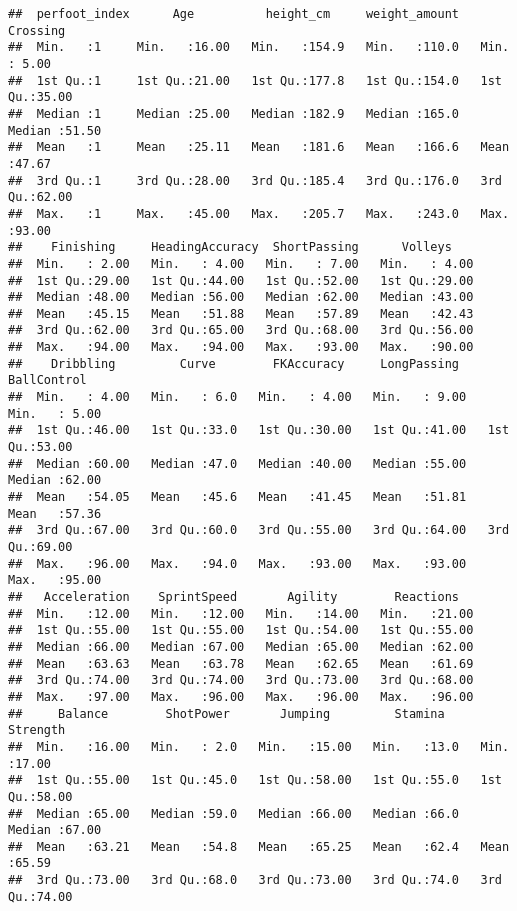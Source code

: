 \documentclass[
]{article}
\begin{document}
\begin{verbatim}
##  perfoot_index      Age          height_cm     weight_amount      Crossing    
##  Min.   :1     Min.   :16.00   Min.   :154.9   Min.   :110.0   Min.   : 5.00  
##  1st Qu.:1     1st Qu.:21.00   1st Qu.:177.8   1st Qu.:154.0   1st Qu.:35.00  
##  Median :1     Median :25.00   Median :182.9   Median :165.0   Median :51.50  
##  Mean   :1     Mean   :25.11   Mean   :181.6   Mean   :166.6   Mean   :47.67  
##  3rd Qu.:1     3rd Qu.:28.00   3rd Qu.:185.4   3rd Qu.:176.0   3rd Qu.:62.00  
##  Max.   :1     Max.   :45.00   Max.   :205.7   Max.   :243.0   Max.   :93.00  
##    Finishing     HeadingAccuracy  ShortPassing      Volleys     
##  Min.   : 2.00   Min.   : 4.00   Min.   : 7.00   Min.   : 4.00  
##  1st Qu.:29.00   1st Qu.:44.00   1st Qu.:52.00   1st Qu.:29.00  
##  Median :48.00   Median :56.00   Median :62.00   Median :43.00  
##  Mean   :45.15   Mean   :51.88   Mean   :57.89   Mean   :42.43  
##  3rd Qu.:62.00   3rd Qu.:65.00   3rd Qu.:68.00   3rd Qu.:56.00  
##  Max.   :94.00   Max.   :94.00   Max.   :93.00   Max.   :90.00  
##    Dribbling         Curve        FKAccuracy     LongPassing     BallControl   
##  Min.   : 4.00   Min.   : 6.0   Min.   : 4.00   Min.   : 9.00   Min.   : 5.00  
##  1st Qu.:46.00   1st Qu.:33.0   1st Qu.:30.00   1st Qu.:41.00   1st Qu.:53.00  
##  Median :60.00   Median :47.0   Median :40.00   Median :55.00   Median :62.00  
##  Mean   :54.05   Mean   :45.6   Mean   :41.45   Mean   :51.81   Mean   :57.36  
##  3rd Qu.:67.00   3rd Qu.:60.0   3rd Qu.:55.00   3rd Qu.:64.00   3rd Qu.:69.00  
##  Max.   :96.00   Max.   :94.0   Max.   :93.00   Max.   :93.00   Max.   :95.00  
##   Acceleration    SprintSpeed       Agility        Reactions    
##  Min.   :12.00   Min.   :12.00   Min.   :14.00   Min.   :21.00  
##  1st Qu.:55.00   1st Qu.:55.00   1st Qu.:54.00   1st Qu.:55.00  
##  Median :66.00   Median :67.00   Median :65.00   Median :62.00  
##  Mean   :63.63   Mean   :63.78   Mean   :62.65   Mean   :61.69  
##  3rd Qu.:74.00   3rd Qu.:74.00   3rd Qu.:73.00   3rd Qu.:68.00  
##  Max.   :97.00   Max.   :96.00   Max.   :96.00   Max.   :96.00  
##     Balance        ShotPower       Jumping         Stamina        Strength    
##  Min.   :16.00   Min.   : 2.0   Min.   :15.00   Min.   :13.0   Min.   :17.00  
##  1st Qu.:55.00   1st Qu.:45.0   1st Qu.:58.00   1st Qu.:55.0   1st Qu.:58.00  
##  Median :65.00   Median :59.0   Median :66.00   Median :66.0   Median :67.00  
##  Mean   :63.21   Mean   :54.8   Mean   :65.25   Mean   :62.4   Mean   :65.59  
##  3rd Qu.:73.00   3rd Qu.:68.0   3rd Qu.:73.00   3rd Qu.:74.0   3rd Qu.:74.00  

\end{verbatim}
\end{document}
